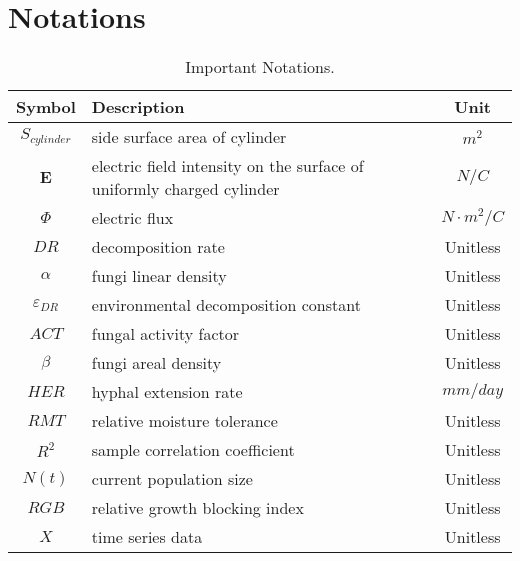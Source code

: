 \section{Notations}
\begin{table}[H]
  \centering
  \caption{Important Notations.}
  \label{Notation}
  \begin{tabular*}{\hsize}{@{\extracolsep{\fill}}clc}
    \toprule
    Symbol & Description & Unit \\
    \midrule
    $S_{cylinder}$ & side surface area of cylinder & $m^2$ \\
    $\bm{E}$ & electric field intensity on the surface of uniformly charged cylinder & $N/C$ \\
    $\Phi$ & electric flux & $N\cdot m^2/C$ \\
    $DR$ & decomposition rate & Unitless \\
    $\alpha$ & fungi linear density & Unitless \\
    $\varepsilon_{DR}$ & environmental decomposition constant & Unitless \\
    $ACT$ & fungal activity factor & Unitless \\
    $\beta$ & fungi areal density & Unitless \\
    $HER$ & hyphal extension rate & $mm/day$ \\
    $RMT$ & relative moisture tolerance & Unitless \\
    $R^2$ & sample correlation coefficient & Unitless \\
    $N(t)$ & current population size & Unitless \\
    $RGB$ & relative growth blocking index & Unitless \\
    $X$ & time series data & Unitless \\
    \bottomrule
  \end{tabular*}
\end{table}